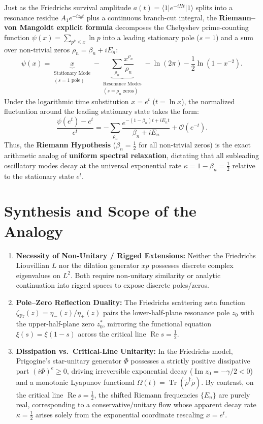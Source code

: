 \documentclass[11pt,a4paper]{article}
\newcommand{\Tr}{\operatorname{Tr}}
\newcommand{\Real}{\operatorname{Re}}
\newcommand{\Imag}{\operatorname{Im}}
\begin{document}
Just as the Friedrichs survival amplitude $a(t) = \langle 1 \rvert e^{-iHt} \lvert 1\rangle$ splits into a resonance residue $A_1 e^{-iz_0 t}$ plus a continuous branch-cut integral, the \textbf{Riemann--von Mangoldt explicit formula} decomposes the Chebyshev prime-counting function $\psi(x) = \sum_{p^k \le x} \ln p$ into a leading stationary pole ($s = 1$) and a sum over non-trivial zeros $\rho_n = \beta_n + iE_n$:
\begin{equation}
\psi(x) = \underbrace{x}_{\substack{\text{Stationary Mode} \\ (s = 1 \text{ pole})}} - \underbrace{\sum_{\rho_n} \frac{x^{\rho_n}}{\rho_n}}_{\substack{\text{Resonance Modes} \\ (s = \rho_n \text{ zeros})}} - \ln(2\pi) - \frac{1}{2}\ln\left(1 - x^{-2}\right).
\end{equation}
Under the logarithmic time substitution $x = e^t$ ($t = \ln x$), the normalized fluctuation around the leading stationary state takes the form:
\begin{equation}
\frac{\psi(e^t) - e^t}{e^t} = -\sum_{\rho_n} \frac{e^{-(1-\beta_n)t + iE_n t}}{\beta_n + iE_n} + \mathcal{O}(e^{-t}).
\end{equation}
Thus, the \textbf{Riemann Hypothesis} ($\beta_n = \frac{1}{2}$ for all non-trivial zeros) is the exact arithmetic analog of \textbf{uniform spectral relaxation}, dictating that all subleading oscillatory modes decay at the universal exponential rate $\kappa = 1 - \beta_n = \frac{1}{2}$ relative to the stationary state $e^t$.

\section{Synthesis and Scope of the Analogy}

\begin{enumerate}
    \item \textbf{Necessity of Non-Unitary / Rigged Extensions:} Neither the Friedrichs Liouvillian $L$ nor the dilation generator $xp$ possesses discrete complex eigenvalues on $L^2$. Both require non-unitary similarity or analytic continuation into rigged spaces to expose discrete poles/zeros.
    \item \textbf{Pole--Zero Reflection Duality:} The Friedrichs scattering zeta function $\zeta_{\mathrm{Fr}}(z) = \eta_-(z)/\eta_+(z)$ pairs the lower-half-plane resonance pole $z_0$ with the upper-half-plane zero $z_0^*$, mirroring the functional equation $\xi(s) = \xi(1-s)$ across the critical line $\Real s = \frac{1}{2}$.
    \item \textbf{Dissipation vs.\ Critical-Line Unitarity:} In the Friedrichs model, Prigogine's star-unitary generator $\Phi$ possesses a strictly positive dissipative part $(i\Phi)^e \ge 0$, driving irreversible exponential decay ($\Imag z_0 = -\gamma/2 < 0$) and a monotonic Lyapunov functional $\Omega(t) = \Tr(\tilde{\rho}^\dagger \tilde{\rho})$. By contrast, on the critical line $\Real s = \frac{1}{2}$, the shifted Riemann frequencies $\{E_n\}$ are purely real, corresponding to a conservative/unitary flow whose apparent decay rate $\kappa = \frac{1}{2}$ arises solely from the exponential coordinate rescaling $x = e^t$.
\end{enumerate}
\end{document}
